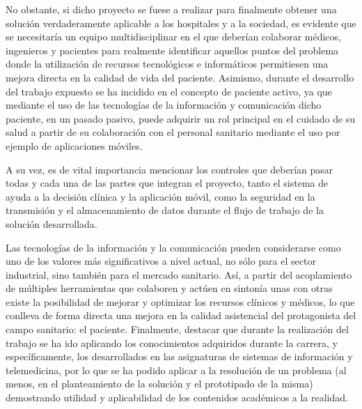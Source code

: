 \documentclass{article}
\begin{document}
No obstante, si dicho proyecto se fuese  a  realizar  para  finalmente
obtener una solución verdaderamente aplicable a los hospitales y a  la
sociedad, es evidente que se necesitaría un equipo multidisciplinar en
el  que  deberían  colaborar  médicos,	ingenieros  y  pacientes  para
realmente  identificar	aquellos  puntos   del	 problema   donde   la
utilización de recursos tecnológicos e	informáticos  permitiesen  una
mejora directa en la calidad de vida del paciente.  Asimismo,  durante
el desarrollo del trabajo expuesto se ha incidido en  el  concepto  de
paciente activo, ya que mediante el  uso  de  las  tecnologías	de  la
información y comunicación dicho paciente, en un pasado pasivo,  puede
adquirir un rol principal en el cuidado de su salud  a	partir	de  su
colaboración con el personal sanitario mediante el uso por ejemplo  de
aplicaciones móviles.

A su vez, es de vital importancia mencionar los controles que deberían
pasar todas y cada una de las partes que integran el  proyecto,  tanto
el sistema de ayuda a la decisión clínica y la aplicación móvil,  como
la seguridad en la transmisión y el almacenamiento de datos durante el
flujo de trabajo de la solución desarrollada.

Las  tecnologías  de  la  información	y   la	 comunicación	pueden
considerarse como uno  de  los	valores  más  significativos  a  nivel
actual, no sólo para  el  sector  industrial,  sino  también  para  el
mercado sanitario.   Así,  a  partir  del  acoplamiento  de  múltiples
herramientas que colaboren y actúen en sintonía unas con otras	existe
la posibilidad de mejorar y optimizar los recursos clínicos y médicos,
lo que conlleva de forma directa una mejora en la calidad  asistencial
del  protagonista  del	campo  sanitario:  el  paciente.   Finalmente,
destacar que durante la realización del trabajo se  ha	ido  aplicando
los conocimientos adquiridos durante la  carrera,  y  específicamente,
los desarrollados en las asignaturas  de  sistemas  de	información  y
telemedicina, por lo que se ha podido aplicar a la  resolución	de  un
problema  (al  menos,  en  el  planteamiento  de  la  solución	y   el
prototipado de la misma) demostrando utilidad y aplicabilidad  de  los
contenidos académicos a la realidad.


\newpage


\end{document}
